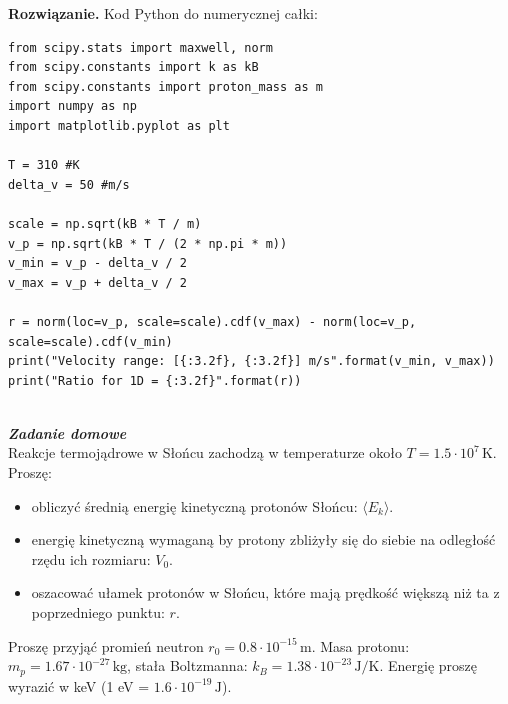 \documentclass[11pt,a4paper]{article}
\newcounter{zaddom}\newcommand{\zaddom}[1][]{\addtocounter{zaddom}{1} ~\\  {\bf \emph{Zadanie domowe \arabic{zaddom} #1 }} \\}
\newenvironment{solution}{\vspace{1cm} \par\textbf{Rozwiązanie.} \vspace{1cm}}{}
\begin{document}
\begin{solution}
Kod Python do numerycznej całki:
\begin{verbatim}
from scipy.stats import maxwell, norm
from scipy.constants import k as kB
from scipy.constants import proton_mass as m
import numpy as np
import matplotlib.pyplot as plt

T = 310 #K
delta_v = 50 #m/s

scale = np.sqrt(kB * T / m)
v_p = np.sqrt(kB * T / (2 * np.pi * m))
v_min = v_p - delta_v / 2
v_max = v_p + delta_v / 2

r = norm(loc=v_p, scale=scale).cdf(v_max) - norm(loc=v_p, scale=scale).cdf(v_min)
print("Velocity range: [{:3.2f}, {:3.2f}] m/s".format(v_min, v_max))
print("Ratio for 1D = {:3.2f}".format(r))
\end{verbatim}

\newpage
\end{solution}
\zaddom[]

Reakcje termojądrowe w Słońcu zachodzą w temperaturze około 
$T = 1.5 \cdot 10^7\,\text{K}$. Proszę:
\begin{itemize}
  \item obliczyć średnią energię kinetyczną protonów Słońcu: $\langle E_k \rangle$.
  \item energię kinetyczną wymaganą by protony zbliżyły się do siebie na 
        odległość rzędu ich rozmiaru: $V_{0}$.
  \item oszacować ułamek protonów w Słońcu, które mają prędkość większą niż ta 
        z poprzedniego punktu: $r$.
\end{itemize}

Proszę przyjąć promień neutron  $r_{0} = 0.8 \cdot 10^{-15}\,\text{m}$.
Masa protonu: $m_p = 1.67 \cdot 10^{-27}\,\text{kg}$,
stała Boltzmanna: $k_B = 1.38 \cdot 10^{-23}\,\text{J/K}$.
Energię proszę wyrazić w keV (1 eV = $1.6 \cdot 10^{-19}\,\text{J}$).
\end{document}

